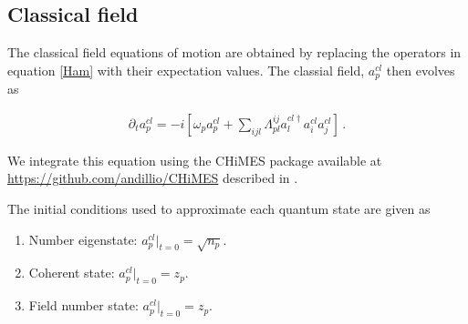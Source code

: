 \documentclass[aps,prd,twocolumn,superscriptaddress]{revtex4-1}
\begin{document}
\begin{comment}
\begin{enumerate}
    \item $k_1 = F\left(a^{cl}_p(t)\right)$ 
    \item $k_2 = F\left( a^{cl}_p(t) + k_1/2 \right)$
    \item $k_3 = F\left( a^{cl}_p(t) + k_2/2 \right)$
    \item $k_4 = F\left( a^{cl}_p(t) + k_3 \right)$
    \item $a^{cl}_p(t + \Delta t) = \frac{1}{6} \left( k_1 + 2k_2 + 2 k_3 + k_4 \right)$
\end{enumerate}

where $F$ is the update function 

\begin{align}
    F(a_p) =  a_p \left( 1 - i \, \omega_p \, \Delta t \right) - i\, f(a)_p\,\Delta t \, ,
\end{align}

with $f$ defining the potential as 

\begin{align}
    &f(a)_p = \mathcal{F}\left[ V(x) \, \psi(x) \right]_p \, , \\
    &V(x) = \mathcal{F}^{-1}\left[ \mathcal{F}\left[ \psi^\dagger(y) \psi(y) \right]_i \left( \frac{C}{k_i^2} + \Lambda_0 \right)  \right](x) \, . \nonumber
\end{align}
\end{comment}

\subsection{Classical field}

The classical field equations of motion are obtained by replacing the operators in equation \eqref{Ham} with their expectation values. The classial field, $a^{cl}_p$ then evolves as  

\begin{align} \label{classicalFieldEqns}
    \partial_t a^{cl}_p = -i\left[ \omega_p a^{cl}_p + \sum_{ijl} \Lambda^{ij}_{pl} a^{cl\dagger}_l a^{cl}_i a^{cl}_j \right] \, .
\end{align}

We integrate this equation using the CHiMES package available at \href{https://github.com/andillio/CHiMES}{https://github.com/andillio/CHiMES} described in \cite{Eberhardt2021}.

The initial conditions used to approximate each quantum state are given as 
\begin{enumerate}
    \item Number eigenstate: $a^{cl}_p \biggr\rvert_{t=0} = \sqrt{ n_p }$. 
    \item Coherent state: $a^{cl}_p \biggr\rvert_{t=0} = z_p$. 
    \item Field number state: $a^{cl}_p \biggr\rvert_{t=0} = z_p$.
\end{enumerate}
\end{document}

